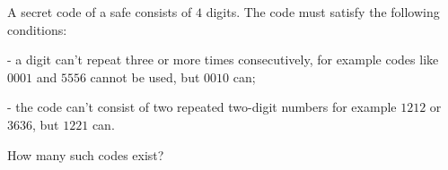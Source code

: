 A secret code of a safe consists of $4$ digits. The code must satisfy the following conditions:

- a digit can't repeat three or more times consecutively, for example codes like $0001$ and $5556$ cannot be used, but $0010$ can;

- the code can't consist of two repeated two-digit numbers for example $1212$ or $3636$, but $1221$ can.

How many such codes exist?
